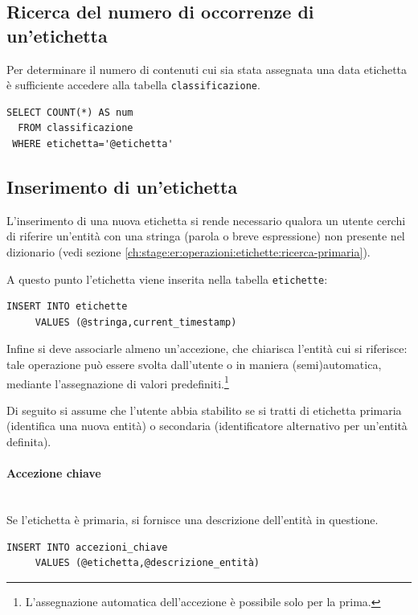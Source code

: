 \documentclass[10pt,a4paper,headinclude,footinclude,hidelinks]{scrreprt} %
\begin{document}
	\subsection{Ricerca del numero di occorrenze di un'etichetta}
	\label{ch:stage:er:operazioni:etichette:occorrenze}
	Per determinare il numero di contenuti cui sia stata assegnata una data etichetta è sufficiente accedere alla tabella \texttt{classificazione}.

\begin{verbatim}
SELECT COUNT(*) AS num
  FROM classificazione
 WHERE etichetta='@etichetta'
\end{verbatim}

	\subsection{Inserimento di un'etichetta}
	\label{ch:stage:er:operazioni:etichette:inserimento}
	L'inserimento di una nuova etichetta si rende necessario qualora un utente cerchi di riferire un'entità con una stringa (parola o breve espressione) non presente nel dizionario (vedi sezione \ref{ch:stage:er:operazioni:etichette:ricerca-primaria}).

	A questo punto l'etichetta viene inserita nella tabella \texttt{etichette}:
\begin{verbatim}
INSERT INTO etichette
     VALUES (@stringa,current_timestamp)
\end{verbatim}

	Infine si deve associarle almeno un'accezione, che chiarisca l'entità cui si riferisce: tale operazione può essere svolta dall'utente o in maniera (semi)automatica, mediante l'assegnazione di valori predefiniti.\footnote{L'assegnazione automatica dell'accezione è possibile solo per la prima.}

	Di seguito si assume che l'utente abbia stabilito se si tratti di etichetta primaria (identifica una nuova entità) o secondaria (identificatore alternativo per un'entità definita).

	\paragraph{Accezione chiave} \hfill \\
	Se l'etichetta è primaria, si fornisce una descrizione dell'entità in questione.
\begin{verbatim}
INSERT INTO accezioni_chiave
     VALUES (@etichetta,@descrizione_entità)
\end{verbatim}
\end{document}
